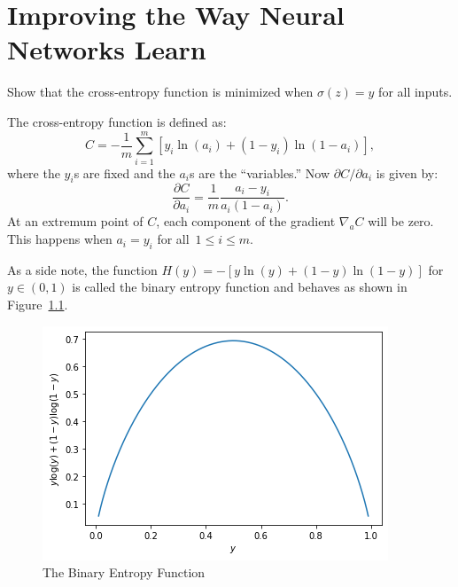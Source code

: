 \chapter{Improving the Way Neural Networks Learn}


\begin{exercise}
Show that the cross-entropy function is minimized when $\sigma(z) = y$ for all inputs.
\end{exercise}
\begin{solution}
The cross-entropy function is defined as:
\[
    C = - \frac{1}{m} \sum_{i = 1}^m [y_i \ln (a_i) + (1 - y_i) \ln (1 - a_i)],
\]
where the $y_i$s are fixed and the $a_i$s are the ``variables.'' Now $\partial C / \partial a_i$
is given by:
\[
    \frac{\partial C}{\partial a_i} = \frac{1}{m} \frac{a_i - y_i}{a_i (1 - a_i)}. 
\]
At an extremum point of $C$, each component of the gradient $\nabla_a C$ will be zero. This 
happens when $a_i = y_i$ for all~$1 \leq i \leq m$. 

As a side note, the function $H(y) = - [y \ln(y) + (1 - y) \ln (1 - y)]$ for $y \in (0, 1)$ 
is called the binary entropy function and behaves as shown in Figure~\ref{fig:binary_entropy}. 
\end{solution}

\begin{figure}[ht]
\begin{center}
\includegraphics[scale=0.60]{entropy.png}
\end{center}
\caption{The Binary Entropy Function}
\label{fig:binary_entropy}
\end{figure}

